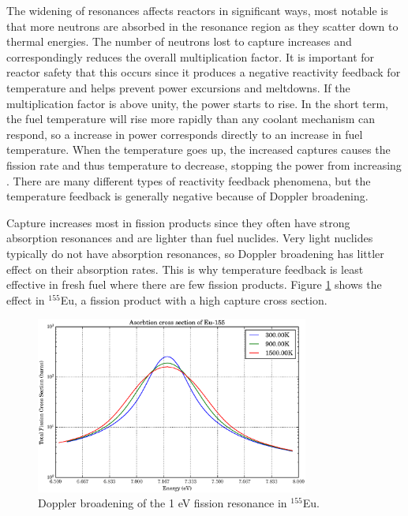 The widening of resonances affects reactors in significant ways, most notable is that more neutrons are absorbed in the resonance region as they scatter down to thermal energies.  The number of neutrons lost to capture increases and correspondingly reduces the overall multiplication factor.  It is important for reactor safety that this occurs since it produces a negative reactivity feedback for temperature and helps prevent power excursions and meltdowns.  If the multiplication factor is above unity, the power starts to rise.  In the short term, the fuel temperature will rise more rapidly than any coolant mechanism can respond, so a increase in power corresponds directly to an increase in fuel temperature.
  When the temperature goes up, the increased captures causes the fission rate and thus temperature to decrease, stopping the power from increasing \cite{duderstadt}. There are many different types of reactivity feedback phenomena, but the temperature feedback is generally negative because of Doppler broadening.  
  
Capture increases most in fission products since they often have strong absorption resonances and are lighter than fuel nuclides.  Very light nuclides typically do not have absorption resonances, so Doppler broadening has littler effect on their absorption rates.
  This is why temperature feedback is least effective in fresh fuel where there are few fission products.  Figure \ref{xs_eu_broaden} shows the effect in  $^{155}$Eu, a fission product with a high capture cross section.

\begin{figure}[h!]
  \centering
    \includegraphics[width=0.8\textwidth]{graphics/xs_eu_broaden.eps}
     \caption{Doppler broadening of the 1 eV fission resonance in  $^{155}$Eu.  \label{xs_eu_broaden}}
\end{figure}

